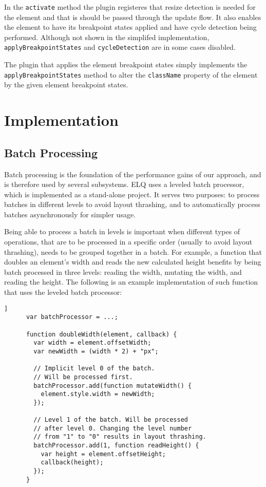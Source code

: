 \documentclass{acm_proc_article-sp}
\newcommand{\code}[1]{\texttt{#1}}
\newcommand{\elq}{ELQ}
\begin{document}
    In the \code{activate} method the plugin registeres that resize detection is needed for the element and that is should be passed through the update flow.
    It also enables the element to have its breakpoint states applied and have cycle detection being performed.
    Although not shown in the simplifed implementation, \code{applyBreakpointStates} and \code{cycleDetection} are in some cases disabled.

    The plugin that applies the element breakpoint states simply implements the \code{applyBreakpointStates} method to alter the \code{className} property of the element by the given element breakpoint states.

\section{Implementation}
  \subsection{Batch Processing}\label{sec:imp_batch_processor}
    Batch processing is the foundation of the performance gains of our approach, and is therefore used by several subsystems.
    \elq{} uses a leveled batch processor, which is implemented as a stand-alone project.
    It serves two purposes: to process batches in different levels to avoid layout thrashing, and to automatically process batches asynchronously for simpler usage.

    Being able to process a batch in levels is important when different types of operations, that are to be processed in a specific order (usually to avoid layout thrashing), needs to be grouped together in a batch.
    For example, a function that doubles an element's width and reads the new calculated height benefits by being batch processed in three levels: reading the width, mutating the width, and reading the height.
    The following is an example implementation of such function that uses the leveled batch processor:

    \begin{lstlisting}[gobble=6,label={},caption={},captionpos=b]]
      var batchProcessor = ...;

      function doubleWidth(element, callback) {
        var width = element.offsetWidth;
        var newWidth = (width * 2) + "px";

        // Implicit level 0 of the batch. 
        // Will be processed first.
        batchProcessor.add(function mutateWidth() {
          element.style.width = newWidth;
        });

        // Level 1 of the batch. Will be processed 
        // after level 0. Changing the level number 
        // from "1" to "0" results in layout thrashing.
        batchProcessor.add(1, function readHeight() {
          var height = element.offsetHeight;
          callback(height);
        });
      }
    \end{lstlisting}
\end{document}
